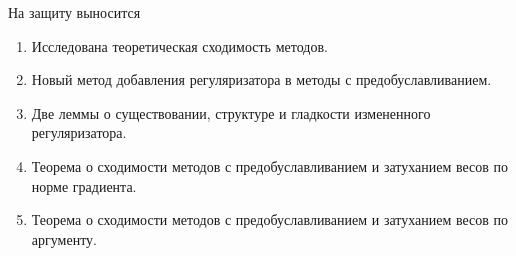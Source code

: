 \documentclass[aspectratio=169, 12pt]{beamer}
\begin{document}
\begin{frame}{На защиту выносится}
    \begin{enumerate}
        \item Исследована теоретическая сходимость методов.
        \item Новый метод добавления регуляризатора в методы с предобуславливанием.
        \item Две леммы о существовании, структуре и гладкости измененного регуляризатора.
        \item Теорема о сходимости методов с предобуславливанием и затуханием весов по норме градиента.
        \item Теорема о сходимости методов с предобуславливанием и затуханием весов по аргументу.
    \end{enumerate}
\end{frame}
\end{document}
